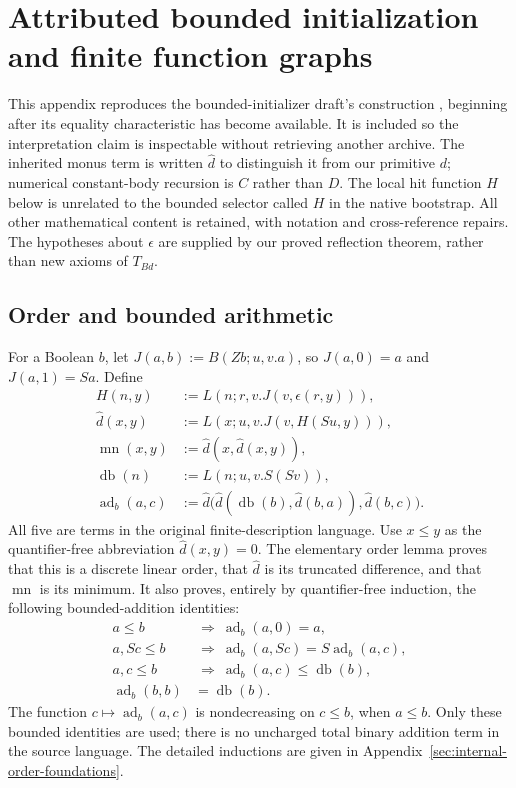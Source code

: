 \section{Attributed bounded initialization and finite function graphs}
\label{app:bounded}
This appendix reproduces the bounded-initializer draft's construction
\cite{bounded}, beginning after its equality characteristic has become
available. It is included so the interpretation claim is inspectable
without retrieving another archive. The inherited monus term is written
$\widehat d$ to distinguish it from our primitive $d$; numerical constant-body
recursion is $C$ rather than $D$. The local hit function $H$ below is unrelated
to the bounded selector called $H$ in the native bootstrap.
All other mathematical content is retained, with notation and cross-reference
repairs. The hypotheses about $\epsilon$ are supplied by our proved
reflection theorem, rather than new axioms of $T_{Bd}$.

\subsection{Order and bounded arithmetic}

For a Boolean $b$, let $J(a,b):=B(Zb;u,v.a)$, so
$J(a,0)=a$ and $J(a,1)=Sa$.  Define
\begin{align*}
 H(n,y)&:=L(n;r,v.J(v,\epsilon(r,y))),\\
 \widehat d(x,y)&:=L(x;u,v.J(v,H(Su,y))),\\
 \operatorname{mn}(x,y)&:=\widehat d(x,\widehat d(x,y)),\\
 \operatorname{db}(n)&:=L(n;u,v.S(Sv)),\\
 \operatorname{ad}_b(a,c)&:=
 \widehat d\bigl(\widehat d(\operatorname{db}(b),\widehat d(b,a)),\widehat d(b,c)\bigr).
\end{align*}
All five are terms in the original finite-description language.
Use $x\leq y$ as the quantifier-free abbreviation $\widehat d(x,y)=0$.
The elementary order lemma proves that this is a discrete linear order,
that $\widehat d$ is its truncated difference, and that $\operatorname{mn}$
is its minimum.  It also proves, entirely by quantifier-free induction,
the following bounded-addition identities:
\begin{align}
 a\leq b&\ \Longrightarrow\ \operatorname{ad}_b(a,0)=a,
 \label{eq:ib-add0}\\
 a,Sc\leq b&\ \Longrightarrow\
 \operatorname{ad}_b(a,Sc)=S\operatorname{ad}_b(a,c),
 \label{eq:ib-addS}\\
 a,c\leq b&\ \Longrightarrow\
 \operatorname{ad}_b(a,c)\leq\operatorname{db}(b),
 \label{eq:ib-addbound}\\
 \operatorname{ad}_b(b,b)&=\operatorname{db}(b).
 \label{eq:ib-adddiag}
\end{align}
The function $c\mapsto\operatorname{ad}_b(a,c)$ is nondecreasing on
$c\leq b$, when $a\leq b$.  Only these bounded identities are used;
there is no uncharged total binary addition term in the source language.
The detailed inductions are given in Appendix~\ref{sec:internal-order-foundations}.

